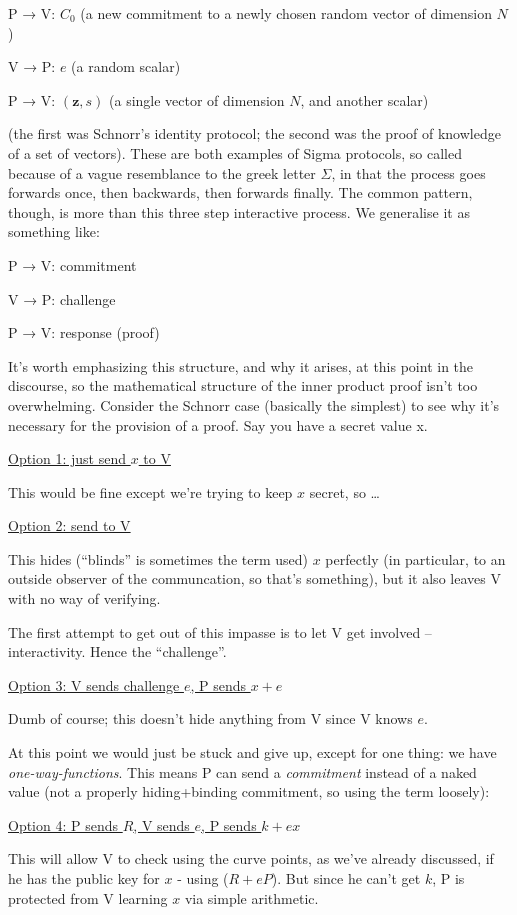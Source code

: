 \documentclass[10pt,a4paper]{article}
\begin{document}
P → V: $C_0$ (a new commitment to a newly chosen random vector of dimension $N$)

V → P: $e$ (a random scalar)

P → V: $(\mathbf{z}, s)$ (a single vector of dimension $N$, and another scalar)

(the first was Schnorr's identity protocol; the second was the proof of
knowledge of a set of vectors). These are both examples of Sigma
protocols, so called because of a vague resemblance to the greek letter
$\Sigma$, in that the process goes forwards once, then backwards, then forwards
finally. The common pattern, though, is more than this three step
interactive process. We generalise it as something like:

P → V: commitment

V → P: challenge

P → V: response (proof)

It's worth emphasizing this structure, and why it arises, at this point
in the discourse, so the mathematical structure of the inner product
proof isn't too overwhelming. Consider the Schnorr case (basically the
simplest) to see why it's necessary for the provision of a proof. Say
you have a secret value x.

\underline{Option 1: just send $x$ to V}

This would be fine except we're trying to keep $x$ secret, so \ldots{}

\underline{Option 2: send to V}

This hides (``blinds'' is sometimes the term used) $x$ perfectly (in
particular, to an outside observer of the communcation, so that's
something), but it also leaves V with no way of verifying.

The first attempt to get out of this impasse is to let V get involved --
interactivity. Hence the ``challenge''.

\underline{Option 3: V sends challenge $e$, P sends $x+e$}

Dumb of course; this doesn't hide anything from V since V knows $e$.

At this point we would just be stuck and give up, except for one thing:
we have \emph{one-way-functions}. This means P can send a
\emph{commitment} instead of a naked value (not a properly
hiding+binding commitment, so using the term loosely):

\underline{Option 4: P sends $R$, V sends $e$, P sends $k+ex$}

This will allow V to check using the curve points, as we've already
discussed, if he has the public key for $x$ - using ($R+eP$). But since he can't
get $k$, P is protected from V learning $x$ via simple arithmetic.
\end{document}
